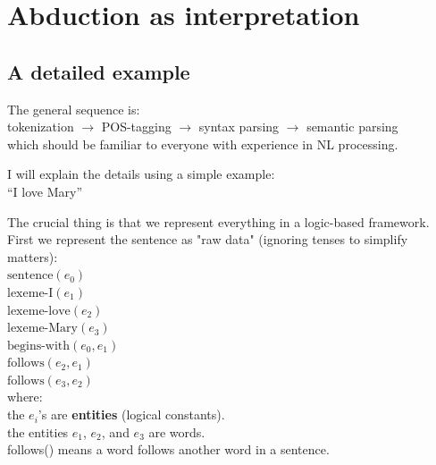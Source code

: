 
\section{Abduction as interpretation}
\label{sec:abduction-as-interpretation}

\subsection{A detailed example}

The general sequence is:\\
\hspace*{1cm} tokenization $\rightarrow$ POS-tagging $\rightarrow$ syntax parsing $\rightarrow$ semantic parsing\\
which should be familiar to everyone with experience in NL processing.

I will explain the details using a simple example:\\
\hspace*{1cm} ``I love Mary''

The crucial thing is that we represent everything in a logic-based framework. First we represent the sentence as "raw data" (ignoring tenses to simplify matters):\\
\hspace*{1cm} $\mbox{sentence}(e_0)$\\
\hspace*{1cm} $\mbox{lexeme-I}(e_1)$\\
\hspace*{1cm} $\mbox{lexeme-love}(e_2)$\\
\hspace*{1cm} $\mbox{lexeme-Mary}(e_3)$\\
\hspace*{1cm} $\mbox{begins-with}(e_0, e_1)$\\
\hspace*{1cm} $\mbox{follows}(e_2, e_1)$\\
\hspace*{1cm} $\mbox{follows}(e_3, e_2)$\\
where:\\
\hspace*{1cm} the $e_i$'s are \textbf{entities} (logical constants).\\
\hspace*{1cm} the entities $e_1$, $e_2$, and $e_3$ are words.\\
\hspace*{1cm} follows() means a word follows another word in a sentence.

